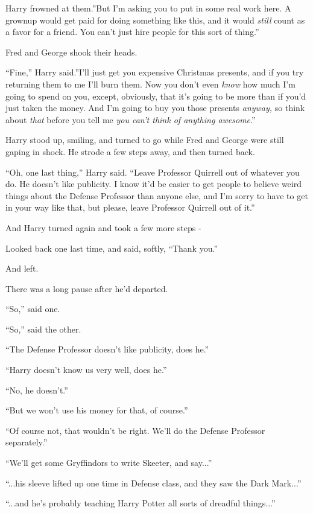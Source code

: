 Harry frowned at them.''But I'm asking you to put in some real work
here. A grownup would get paid for doing something like this, and it
would \emph{still} count as a favor for a friend. You can't just hire
people for this sort of thing.''

Fred and George shook their heads.

``Fine,'' Harry said.''I'll just get you expensive Christmas presents,
and if you try returning them to me I'll burn them. Now you don't even
\emph{know} how much I'm going to spend on you, except, obviously, that
it's going to be more than if you'd just taken the money. And I'm going
to buy you those presents \emph{anyway,} so think about \emph{that}
before you tell me \emph{you can't think of anything awesome}.''

Harry stood up, smiling, and turned to go while Fred and George were
still gaping in shock. He strode a few steps away, and then turned back.

``Oh, one last thing,'' Harry said. ``Leave Professor Quirrell out of
whatever you do. He doesn't like publicity. I know it'd be easier to get
people to believe weird things about the Defense Professor than anyone
else, and I'm sorry to have to get in your way like that, but please,
leave Professor Quirrell out of it.''

And Harry turned again and took a few more steps -

Looked back one last time, and said, softly, ``Thank you.''

And left.

There was a long pause after he'd departed.

``So,'' said one.

``So,'' said the other.

``The Defense Professor doesn't like publicity, does he.''

``Harry doesn't know us very well, does he.''

``No, he doesn't.''

``But we won't use his money for that, of course.''

``Of course not, that wouldn't be right. We'll do the Defense Professor
separately.''

``We'll get some Gryffindors to write Skeeter, and say...''

``...his sleeve lifted up one time in Defense class, and they saw
the Dark Mark...''

``...and he's probably teaching Harry Potter all sorts of dreadful
things...''

